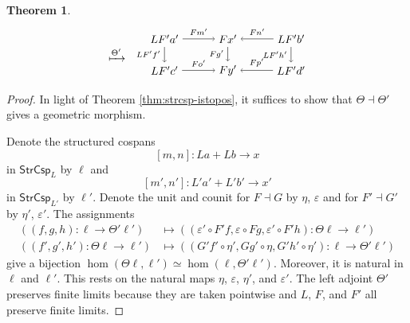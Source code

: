 \documentclass{amsart}
\newcommand{\StrCsp}{\cat{StrCsp}}
\newcommand{\cat}[1]{\mathsf{#1}}
\newcommand{\from}{\colon}
\newcommand{\csp}[3]{#1 + #3 \to #2}
\newtheorem{theorem}{Theorem}[section]
\theoremstyle{remark}
\theoremstyle{definition}
\begin{document}
\begin{theorem}
\[\begin{tikzpicture}
\begin{scope}[shift={(3,0)}]
      \node (1) at (0,0.5) { $ \xmapsto{ \Theta' } $ };
      \end{scope}
      \begin{scope}[shift={(6.5,0)}]
      \node (1) at (-2,1) {\( LF'a' \)};
      \node (2) at (0,1) {\( Fx' \)};
      \node (3) at (2,1) {\( LF'b' \)};
      \node (4) at (-2,0) {\( LF'c' \)};
      \node (5) at (0,0) {\( Fy' \)};
      \node (6) at (2,0) {\( LF'd' \)};
      \draw [->] (1) to node [above] {\scriptsize{\( Fm' \)}} (2);
      \draw [->] (3) to node [above] {\scriptsize{\( Fn' \)}} (2);
      \draw [->] (4) to node [above] {\scriptsize{\( Fo' \)}} (5);
      \draw [->] (6) to node [above] {\scriptsize{\( Fp' \)}} (5);
      \draw [->] (1) to node [left] {\scriptsize{\( LF'f' \)}} (4);
      \draw [->] (2) to node [left] {\scriptsize{\( Fg' \)}} (5);
      \draw [->] (3) to node [left] {\scriptsize{\( LF'h' \)}} (6);  
      \end{scope}
    \end{tikzpicture}
  \]  
\end{theorem}

\begin{proof}
  In light of Theorem \ref{thm:strcsp-istopos}, it suffices to show that
  $ \Theta \dashv \Theta' $ gives a geometric morphism.

  Denote the structured cospans
  \[
    [ m,n ] \colon \csp{La}{x}{Lb}
  \]
  in $ \StrCsp_{ L } $ by $ \ell $ and  
  \[
    [m',n'] \colon \csp{L'a'}{x'}{L'b'}
  \]
  in $ \StrCsp_{ L' } $ by $ \ell' $. Denote the unit and counit
  for $F \dashv G$ by $ \eta $, $ \varepsilon $ and for
  $ F' \dashv G' $ by $ \eta' $, $ \varepsilon' $.  The assignments
  \begin{align*}
    \left(
      ( f,g,h ) \from \ell \to \Theta' \ell'
      \right)
    & \mapsto
    \left(
      ( \varepsilon' \circ F'f , \varepsilon \circ Fg , \varepsilon'
      \circ F'h )
      \from \Theta \ell \to \ell'
      \right) \\
      \left(
      ( f',g',h' ) \from \Theta \ell \to \ell'
      \right)
    & \mapsto
      \left(
      ( G'f' \circ \eta', Gg' \circ \eta , G'h' \circ \eta' )
      \from \ell \to \Theta' \ell'
      \right) 
  \end{align*}
  give a bijection $ \hom ( \Theta \ell , \ell' ) \simeq \hom ( \ell ,
  \Theta' \ell' ) $. Moreover, it is natural in $ \ell $ and $ \ell'
  $. This rests on the natural maps $ \eta $, $ \varepsilon $, $ \eta'
  $, and $ \varepsilon' $. The left adjoint $ \Theta' $ preserves
  finite limits because they are taken pointwise and $ L $, $ F $, and
  $ F' $ all preserve finite limits.
\end{proof}
\end{document}
